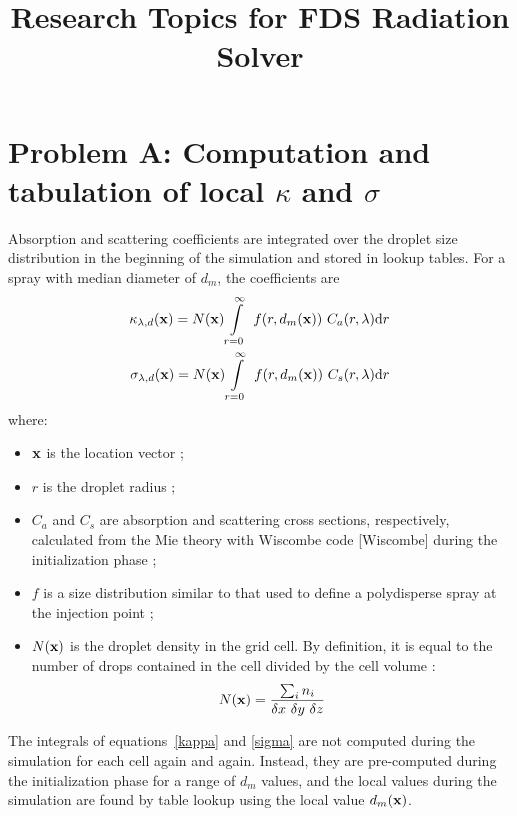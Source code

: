 \documentclass[12pt]{article}
\title{Research Topics for FDS Radiation Solver}
\newcommand{\bx}{{\bf x}}
\begin{document}
\maketitle



\section{Problem A: Computation and tabulation of local $\kappa$ and $\sigma$}
\label{Problem_A}


Absorption and scattering coefficients are integrated over the droplet
size distribution in the beginning of the simulation and stored in
lookup tables. For a spray with median diameter of $d_m$, the
coefficients are 
\begin{eqnarray}
\kappa_{\lambda,d}(\bx) = N(\bx) \int\limits_{r=0}^{\infty}~f(r,d_{m}(\bx))~C_{a}(r,\lambda)\textrm{d}r\label{kappa}\\
\sigma_{\lambda,d}(\bx) = N(\bx) \int\limits_{r=0}^{\infty}~f(r,d_{m}(\bx))~C_{s}(r,\lambda)\textrm{d}r\label{sigma}
\end{eqnarray}
\noindent
where:
\begin{itemize}
\item $\bx$ is the location vector ;
\item $r$ is the droplet radius ;
\item $C_{a}$ and $C_{s}$ are absorption and scattering cross
sections, respectively, calculated from the Mie theory with Wiscombe
code [Wiscombe] during the initialization phase ; 
\item $f$ is a size distribution similar to that used to define a
polydisperse spray at the injection point ;
\item $N(\bx)$ is the droplet density in the grid cell. By definition, it is equal to the number of drops contained in the cell divided by the cell volume :
\begin{equation}
 N (\bx)    =  \frac{\sum_i n_i }{\delta x~\delta y~\delta z} \label{N}
\end{equation}
\end{itemize}
The integrals of equations~\ref{kappa} and \ref{sigma} are not computed during the simulation for each cell again and again. Instead, they are pre-computed
during the initialization phase for a range of $d_m$ values, and the local values during the simulation are found by table lookup using the local value
$d_m(\bx)$.
\end{document}
